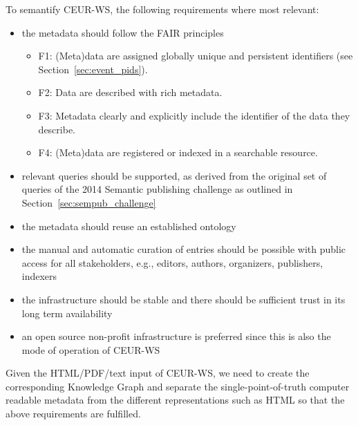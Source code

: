 \documentclass[]{ceurart}
\newcommand{\footnotelink}[2]{\href{#1}{#2}\footnote{#1}}
\begin{document}
To semantify CEUR-WS, the following requirements where most relevant:
\begin{itemize}
    \item the metadata should follow the FAIR \cite{GOFAIR2019,Wilkinson2016} principles 
    \begin{itemize}
    \item F1: (Meta)data are assigned globally unique and persistent identifiers (see Section~\ref{sec:event_pids}).
     \item F2: Data are described with rich metadata.
      \item F3: Metadata clearly and explicitly include the identifier of the data they describe.
      \item F4: (Meta)data are registered or indexed in a searchable resource.
    \end{itemize}
    \item relevant queries should be supported, as derived from the original set of queries of the 2014 Semantic publishing challenge as outlined in Section~\ref{sec:sempub_challenge}
    \item the metadata should reuse an established ontology
    \item the manual and automatic curation of entries should be possible with public access for all stakeholders, e.g., editors, authors, organizers, publishers, indexers
    \item the infrastructure should be stable and there should be sufficient trust in its long term availability
    \item an open source non-profit infrastructure is preferred since this is also the mode of operation of CEUR-WS
\end{itemize}

Given the HTML/PDF/text input of CEUR-WS, we need to create the corresponding Knowledge Graph and separate the single-point-of-truth computer readable metadata from the different representations such as HTML so that the above requirements are fulfilled. 


\end{document}
